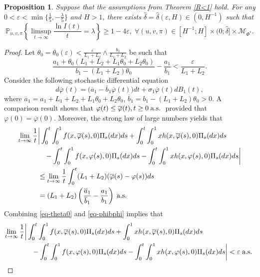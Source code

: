 \documentclass[12pt]{amsart}
\newtheorem{prop}{Proposition}[section]
\theoremstyle{remark}
\numberwithin{equation}{section}
\newcommand{\eps}{\varepsilon}
\newcommand{\M}{\mathcal{M}}
\newcommand{\PP}{\mathbb{P}}
\numberwithin{equation}{section}
\newcommand{\PPi}{\PP_{u,v,\pi}}
\newcommand{\1}{\boldsymbol{1}}
\def\bar{\overline}
\def\a.s{\text{\;a.s.\;}}
\begin{document}
\begin{prop}\label{lm3.1}
Suppose that the assumptions from Theorem \ref{R<1} hold. For any $0<\varepsilon<\min\{\frac 15,-\frac{\lambda}{5}\}$ and $H>1$, there exists $\widehat \delta=\widehat \delta(\eps, H)\in (0,H^{-1})$ such that
$$\PPi\left\{\limsup_{t\to\infty}\dfrac{\ln I(t)}{t}=\lambda  \right\}\geq 1-4\eps,\;\forall (u,v,\pi)\in [H^{-1};H]\times(0;\widehat \delta]\times\M_{\Phi^*}.$$
\end{prop}

\begin{proof}
Let $\theta_0=\theta_0(\eps)<\frac{\eps}{L_1+L_2}\wedge \frac {b_1}{L_1+L_2}$ be such that
\begin{equation}\label{eq-theta0}
\frac{a_1+\theta_0(L_1+L_2+L_1\theta_0+L_2\theta_0)}{b_1-(L_1+L_2)\theta_0}-\frac{a_1}{b_1}<\frac{\eps}{L_1+L_2}.
\end{equation}
Consider the following stochastic differential equation
\begin{equation}\label{eq-bphi}
d \bar\varphi(t)=\big(\bar a_1-\bar b_1\bar \varphi(t)\big)dt+\sigma_1 \bar \varphi(t)dB_1(t),
\end{equation}
where $\bar a_1=a_1+L_1+L_2+L_1\theta_0+L_2\theta_0$, $\bar b_1=b_1-(L_1+L_2)\theta_0>0$.
A comparison result shows that $\varphi(t)\leq\bar\varphi(t),t\geq 0\a.s$ provided that $\varphi(0)=\bar \varphi(0)$.
Moreover, the strong law of large numbers yields that
\begin{equation}\label{eq-phibphi}
\begin{aligned}
\lim_{t\to\infty}\frac 1t&\bigg|\int_0^t\int_0^1f(x,\bar\varphi(s),0)\Pi_s(dx)ds+\int_0^t\int_0^1xh(x,\bar \varphi(s),0)\Pi_s(dx)ds\\
&\quad-\int_0^t\int_0^1f(x,\varphi(s),0)\Pi_s(dx)ds-\int_0^t\int_0^1xh(x, \varphi(s),0)\Pi_s(dx)ds\bigg|\\
&\leq \lim_{t\to\infty} \frac1t\int_0^t( L_1+L_2)(\bar \varphi(s)-\varphi(s))ds\\
&=(L_1+L_2)\left(\frac{\bar a_1}{\bar b_1}-\frac{a_1}{b_1}\right)\a.s
\end{aligned}
\end{equation}
Combining \eqref{eq-theta0} and \eqref{eq-phibphi} implies that
\begin{equation}\label{eq-phibphi-1}
\begin{aligned}
\lim_{t\to\infty}\frac 1t&\bigg|\int_0^t\int_0^1f(x,\bar\varphi(s),0)\Pi_s(dx)ds+\int_0^1xh(x,\bar \varphi(s),0)\Pi_s(dx)ds
\\
&\quad-\int_0^t\int_0^1f(x,\varphi(s),0)\Pi_s(dx)ds-\int_0^t\int_0^1xh(x, \varphi(s),0)\Pi_s(dx)ds\bigg| <\eps\a.s

\end{aligned}
\end{equation}
\end{proof}
\end{document}
